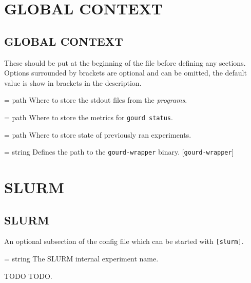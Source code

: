 \documentclass[a4paper,english]{article}
\begin{document}
  \section*{GLOBAL CONTEXT}
  \begin{adjustwidth}{18pt}{0pt}
  \section{GLOBAL CONTEXT}
    These should be put at the beginning of the file before defining any sections.
    Options surrounded by brackets are optional and can be omitted, the default value is show in brackets in the description.

    \begin{Description}[Options]\setlength{\itemsep}{0cm}
        \item[\Opt{output\_path} = path] Where to store the stdout files from the \emph{programs}.
        \item[\Opt{metrics\_path} = path] Where to store the metrics for \texttt{gourd status}.
        \item[\Opt{experiments\_folder} = path] Where to store state of previously ran experiments.
        \item[\oOpt{wrapper} = string] Defines the path to the \texttt{gourd-wrapper} binary. [\texttt{gourd-wrapper}]
    \end{Description}

    \end{adjustwidth}
    \section*{SLURM}
    \begin{adjustwidth}{18pt}{0pt}
    \section{SLURM}

      An optional subsection of the config file which can be started with \texttt{[slurm]}.

      \begin{Description}[Options]\setlength{\itemsep}{0cm}
          \item[\Opt{experiment\_name} = string] The SLURM internal experiment name.
          \item[TODO] TODO.
      \end{Description}

    \end{adjustwidth}
\end{document}
